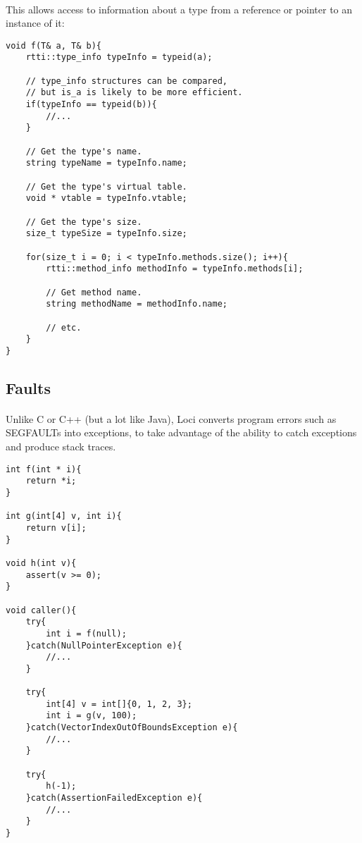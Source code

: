\documentclass[12pt,twoside,notitlepage]{report}
\begin{document}
\paragraph{}
This allows access to information about a type from a reference or pointer to an instance of it:

\begin{lstlisting}
void f(T& a, T& b){
	rtti::type_info typeInfo = typeid(a);
	
	// type_info structures can be compared,
	// but is_a is likely to be more efficient.
	if(typeInfo == typeid(b)){
		//...
	}
	
	// Get the type's name.
	string typeName = typeInfo.name;
	
	// Get the type's virtual table.
	void * vtable = typeInfo.vtable;
	
	// Get the type's size.
	size_t typeSize = typeInfo.size;
	
	for(size_t i = 0; i < typeInfo.methods.size(); i++){
		rtti::method_info methodInfo = typeInfo.methods[i];
		
		// Get method name.
		string methodName = methodInfo.name;
		
		// etc.
	}
}
\end{lstlisting}

\clearpage

\subsection{Faults}

\paragraph{}
Unlike C or C++ (but a lot like Java), Loci converts program errors such as SEGFAULTs into exceptions, to take advantage of the ability to catch exceptions and produce stack traces.


\begin{lstlisting}
int f(int * i){
	return *i;
}

int g(int[4] v, int i){
	return v[i];
}

void h(int v){
	assert(v >= 0);
}

void caller(){
	try{
		int i = f(null);
	}catch(NullPointerException e){
		//...
	}
	
	try{
		int[4] v = int[]{0, 1, 2, 3};
		int i = g(v, 100);
	}catch(VectorIndexOutOfBoundsException e){
		//...
	}
	
	try{
		h(-1);
	}catch(AssertionFailedException e){
		//...
	}
}
\end{lstlisting}
\end{document}
